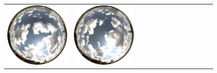 \begin{figure}
\begin{tabular}{@{}rcccccccccccc@{}}
    \includegraphics[width=\customwidth]{./figures/database/20130824_140002.jpg} &
    \includegraphics[width=\customwidth]{./figures/database/20130824_142960.jpg} &

\end{tabular}
\end{figure}
